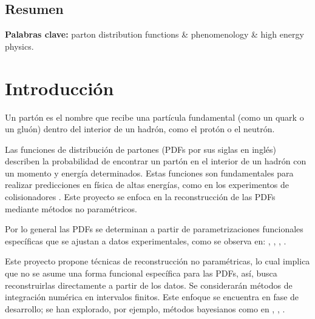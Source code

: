 \documentclass[titlepage,11pt]{report}
\begin{document}
\pagestyle{empty}
\setcounter{page}{0}

%

\section*{Resumen}
\label{sec:resumen}

\vspace{2em}
\textbf{Palabras clave:} parton distribution functions \& phenomenology \& high energy physics.

\newpage
\pagestyle{plain}

\chapter{Introducción}
\label{sec:introduccion}

Un partón es el nombre que recibe una partícula fundamental (como un quark o un gluón) dentro del interior de un hadrón, como el protón o el neutrón.

Las funciones de distribución de partones (PDFs por sus siglas en inglés) describen la probabilidad de encontrar un partón en el interior de un hadrón con un momento y energía determinados. Estas funciones son fundamentales para realizar predicciones en física de altas energías, como en los experimentos de colisionadores \cite{placakyte2011parton}. Este proyecto se enfoca en la reconstrucción de las PDFs mediante métodos no paramétricos.

Por lo general las PDFs se determinan a partir de parametrizaciones funcionales específicas que se ajustan a datos experimentales, como se observa en: \cite{Lopez2025}, \cite{Kovarik:2019xvh}, \cite{Dulat:2015mca}, \cite{Hou:2019efy}.

Este proyecto propone técnicas de reconstrucción no paramétricas, lo cual implica que no se asume una forma funcional específica para las PDFs, así, busca reconstruirlas directamente a partir de los datos. Se considerarán métodos de integración numérica en intervalos finitos. Este enfoque se encuentra en fase de desarrollo; se han explorado, por ejemplo, métodos bayesianos como en \cite{karpie2019reconstructing}, \cite{dutrieux2025simple}, \cite{candido2024bayesian}.
\end{document}
